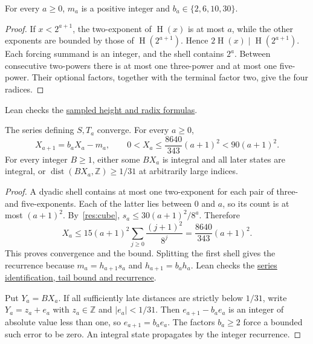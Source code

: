 \documentclass[11pt]{article}
\newcommand{\hgt}{\operatorname{H}}
\begin{document}
\begin{lemma}
\label{res:dyadic-alphabet}
For every $a\ge0$, $m_a$ is a positive integer and
$b_a\in\{2,6,10,30\}$.
\end{lemma}
\begin{proof}
If $x<2^{a+1}$, the two-exponent of $\hgt(x)$ is at most $a$, while the
other exponents are bounded by those of $\hgt(2^{a+1})$.  Hence
$2\hgt(x)\mid\hgt(2^{a+1})$.  Each forcing summand is an integer,
and the shell contains $2^a$.  Between consecutive two-powers there is at
most one three-power and at most one five-power.  Their optional factors,
together with the terminal factor two, give the four radices.
\end{proof}

\noindent Lean checks the \href{https://github.com/wcook04/plectis-erdos/blob/f36a98bf3d3e6f65f1074e3b800e3293d5b8a51a/ErdosProblems/Erdos269/PaperR7ActualOrbit.lean#L48}{sampled height and radix formulas}.

\begin{proposition}
\label{res:actual-orbit}
The series defining $S,T_a$ converge.  For every $a\ge0$,
\[
 X_{a+1}=b_aX_a-m_a,\qquad
 0<X_a\le\frac{8640}{343}(a+1)^2<90(a+1)^2.
\]
For every integer $B\ge1$, either some $BX_a$ is integral and all later
states are integral, or $\operatorname{dist}(BX_a,\mathbb Z)\ge1/31$
at arbitrarily large indices.
\end{proposition}
\begin{proof}
A dyadic shell contains at most one two-exponent for each pair of three-
and five-exponents.  Each of the latter lies between $0$ and $a$, so its
count is at most $(a+1)^2$.  By~\eqref{res:cube},
$s_a\le30(a+1)^2/8^a$.  Therefore
\[
 X_a\le15(a+1)^2\sum_{j\ge0}\frac{(j+1)^2}{8^j}
      =\frac{8640}{343}(a+1)^2.
\]
This proves convergence and the bound.  Splitting the first shell gives
the recurrence because $m_a=h_{a+1}s_a$ and $h_{a+1}=b_ah_a$.
Lean checks the \href{https://github.com/wcook04/plectis-erdos/blob/f36a98bf3d3e6f65f1074e3b800e3293d5b8a51a/ErdosProblems/Erdos269/PaperR7SeriesIdentification.lean#L168}{series identification, tail bound and recurrence}.

Put $Y_a=BX_a$.  If all sufficiently late distances are strictly below
$1/31$, write $Y_a=z_a+e_a$ with $z_a\in\mathbb Z$ and $|e_a|<1/31$.
Then $e_{a+1}-b_ae_a$ is an integer of absolute value less than one, so
$e_{a+1}=b_ae_a$.  The factors $b_a\ge2$ force a bounded such error to be
zero.  An integral state propagates by the integer recurrence.
\end{proof}
\end{document}
